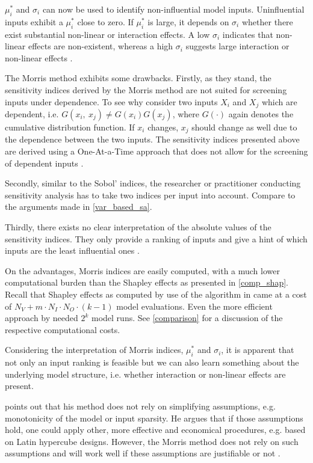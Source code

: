 $\mu_i^\ast$ and $\sigma_i$ can now be used to identify non-influential model inputs. Uninfluential inputs exhibit a $\mu_i^\ast$ close to zero. If $\mu_i^\ast$ is large, it depends on $\sigma_i$ whether there exist substantial non-linear or interaction effects. A low $\sigma_i$ indicates that non-linear effects are non-existent, whereas a high $\sigma_i$ suggests large interaction or non-linear effects \citep{GM17}.

The Morris method exhibits some drawbacks. Firstly, as they stand, the sensitivity indices derived by the Morris method are not suited for screening inputs under dependence. To see why consider two inputs $X_i$ and $X_j$ which are dependent, i.e. $G(x_i,\ x_j) \neq G(x_i)G(x_j)$, where $G(\cdot)$ again denotes the cumulative distribution function. If $x_i$ changes, $x_j$ should change as well due to the dependence between the two inputs. The sensitivity indices presented above are derived using a One-At-a-Time approach that does not allow for the screening of dependent inputs \citep{GM17}.

Secondly, similar to the Sobol' indices, the researcher or practitioner conducting sensitivity analysis has to take two indices per input into account. Compare to the arguments made in \cref{var_based_sa}.

Thirdly, there exists no clear interpretation of the absolute values of the sensitivity indices. They only provide a ranking of inputs and give a hint of which inputs are the least influential ones \citep{GM17}.

On the advantages, Morris indices are easily computed, with a much lower computational burden than the Shapley effects as presented in \cref{comp_shap}. Recall that Shapley effects as computed by use of the algorithm in \citet{SNS16} came at a cost of $N_V+m \cdot N_I \cdot N_O \cdot (k-1)$ model evaluations. Even the more efficient approach by \citet{PRB20} needed $2^k$ model runs. See \cref{comparison} for a discussion of the respective computational costs.

Considering the interpretation of Morris indices, $\mu_i^\ast$ and $\sigma_i$, it is apparent that not only an input ranking is feasible but we can also learn something about the underlying model structure, i.e. whether interaction or non-linear effects are present.

\citet{M91} points out that his method does not rely on simplifying assumptions, e.g. monotonicity of the model or input sparsity. He argues that if those assumptions hold, one could apply other, more effective and economical procedures, e.g. based on Latin hypercube designs. However, the Morris method does not rely on such assumptions and will work well if these assumptions are justifiable or not \citep{M91}.

